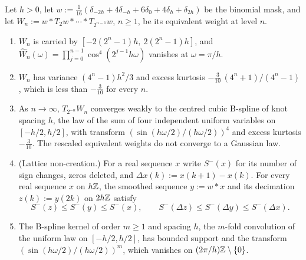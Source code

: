 \begin{proposition}
\label{prop:classical-pyramids-approximate}

Let $h > 0$, let
$w := \tfrac1{16}(\delta_{-2h} + 4\delta_{-h} + 6\delta_0 + 4\delta_h + \delta_{2h})$ be the binomial
mask, and let $W_n := w * T_2w * \cdots * T_{2^{n-1}}w$, $n \ge 1$, be its equivalent weight at level
$n$.
\begin{enumerate}
\item $W_n$ is carried by $[-2(2^n - 1)h,\ 2(2^n - 1)h]$, and
$\widehat W_n(\omega) = \prod_{j=0}^{n-1}\cos^4(2^{j-1}h\omega)$ vanishes at $\omega = \pi/h$.
\item $W_n$ has variance $(4^n - 1)h^2/3$ and excess kurtosis
$-\tfrac{3}{10}\,(4^n + 1)/(4^n - 1)$, which is less than $-\tfrac3{10}$ for every $n$.
\item As $n \to \infty$, $T_{2^{-n}}W_n$ converges weakly to the centred cubic B-spline of knot
spacing $h$, the law of the sum of four independent uniform variables on $[-h/2, h/2]$, with
transform $(\sin(h\omega/2)/(h\omega/2))^4$ and excess kurtosis $-\tfrac3{10}$. The rescaled
equivalent weights do not converge to a Gaussian law.
\item (Lattice non-creation.) For a real sequence $x$ write $S^-(x)$ for its number of sign changes,
zeros deleted, and $\Delta x(k) := x(k+1) - x(k)$. For every real sequence $x$ on $h\mathbb{Z}$, the
smoothed sequence $y := w * x$ and its decimation $z(k) := y(2k)$ on $2h\mathbb{Z}$ satisfy
\[
  S^-(z) \le S^-(y) \le S^-(x), \qquad S^-(\Delta z) \le S^-(\Delta y) \le S^-(\Delta x).
\]
\item The B-spline kernel of order $m \ge 1$ and spacing $h$, the $m$-fold convolution of the uniform
law on $[-h/2, h/2]$, has bounded support and the transform $(\sin(h\omega/2)/(h\omega/2))^m$, which
vanishes on $(2\pi/h)\mathbb{Z} \setminus \{0\}$.
\end{enumerate}
\end{proposition}

